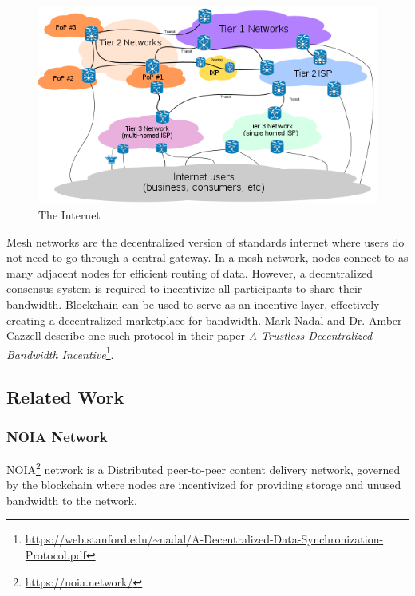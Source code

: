 	\begin{figure}[h]
		\includegraphics[width=\linewidth]{figures/internet-backbone}
		\caption{\label{fig:internet-backbone} The Internet\protect\footnotemark}
	\end{figure}
	
	Mesh networks are the decentralized version of standards internet where users do not need to go through a central gateway. In a mesh network, nodes connect to as many adjacent nodes for efficient routing of data. However, a decentralized consensus system is required to incentivize all participants to share their bandwidth. Blockchain can be used to serve as an incentive layer, effectively creating a decentralized marketplace for bandwidth. Mark Nadal and Dr. Amber Cazzell describe one such protocol in their paper \textit{A Trustless Decentralized Bandwidth Incentive}\footnote{\url{https://web.stanford.edu/~nadal/A-Decentralized-Data-Synchronization-Protocol.pdf}}.
	
	\subsection{Related Work}
		\subsubsection{NOIA Network}
		NOIA\footnote{\url{https://noia.network/}} network is a Distributed peer-to-peer content delivery network, governed by the blockchain where nodes are incentivized for providing storage and unused bandwidth to the network.
		
